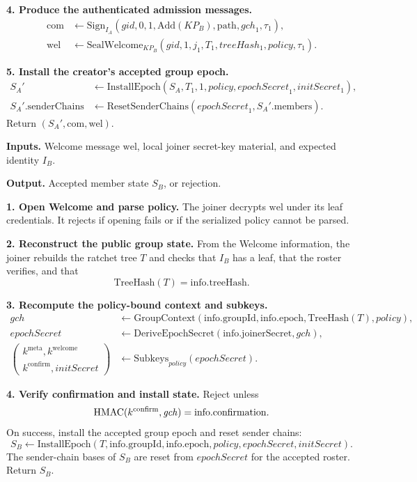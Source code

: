 \documentclass[preprint,12pt]{elsarticle}
\theoremstyle{definition}
\newcommand{\tech}[1]{\textnormal{#1}}
\renewcommand{\mathsf}[1]{\mathrm{#1}}
\newcommand{\HMAC}{\tech{HMAC}}
\newcommand{\gid}{\mathit{gid}}
\newcommand{\gch}{\mathit{gch}}
\newcommand{\initsec}{\mathit{initSecret}}
\newcommand{\epochsec}{\mathit{epochSecret}}
\newcommand{\policy}{\mathit{policy}}
\newcommand{\treehash}{\mathit{treeHash}}
\begin{document}
\begin{algorithm}[H]
\textbf{4. Produce the authenticated admission messages.}
\[
\begin{aligned}
\mathsf{com}&\gets
  \mathrm{Sign}_{I_A}(\gid,0,1,\mathsf{Add}(KP_B),\mathsf{path},\gch_1,\tau_1),\\
\mathsf{wel}&\gets
  \mathrm{SealWelcome}_{KP_B}
    (\gid,1,j_1,T_1,\treehash_1,\policy,\tau_1).
\end{aligned}
\]

\textbf{5. Install the creator's accepted group epoch.}
\[
\begin{aligned}
S_A'&\gets \mathrm{InstallEpoch}(S_A,T_1,1,\policy,\epochsec_1,\initsec_1),\\
S_A'.\mathrm{senderChains}&\gets
  \mathrm{ResetSenderChains}(\epochsec_1,S_A'.\mathrm{members}).
\end{aligned}
\]
Return $(S_A',\mathsf{com},\mathsf{wel})$.
\end{algorithm}
\endgroup

\begingroup
\LinesNotNumbered
\SetAlgoNoLine
\begin{algorithm}[H]
\caption{Process a Welcome as the joining member.}\label{alg:welcome}
\footnotesize
\textbf{Inputs.}
Welcome message $\mathsf{wel}$, local joiner secret-key material, and expected identity $I_B$.

\textbf{Output.}
Accepted member state $S_B$, or rejection.
\vspace{0.25\baselineskip}

\textbf{1. Open Welcome and parse policy.}
The joiner decrypts $\mathsf{wel}$ under its leaf credentials. It rejects if
opening fails or if the serialized policy cannot be parsed.

\textbf{2. Reconstruct the public group state.}
From the Welcome information, the joiner rebuilds the ratchet tree $T$ and
checks that $I_B$ has a leaf, that the roster verifies, and that
\[
  \mathsf{TreeHash}(T)=\mathsf{info.treeHash}.
\]

\textbf{3. Recompute the policy-bound context and subkeys.}
\[
\begin{aligned}
\gch&\gets \mathsf{GroupContext}(\mathsf{info.groupId},
  \mathsf{info.epoch},\mathsf{TreeHash}(T),\policy),\\
\epochsec&\gets
  \mathrm{DeriveEpochSecret}(\mathsf{info.joinerSecret},\gch),\\
\left(\begin{gathered}
  k^{\mathsf{meta}},k^{\mathsf{welcome}}\\
  k^{\mathsf{confirm}},\initsec
\end{gathered}\right)
  &\gets \mathrm{Subkeys}_{\policy}(\epochsec).
\end{aligned}
\]

\textbf{4. Verify confirmation and install state.}
Reject unless
\[
  \HMAC(k^{\mathsf{confirm}},\gch)=\mathsf{info.confirmation}.
\]
On success, install the accepted group epoch and reset sender chains:
\[
S_B\gets \mathrm{InstallEpoch}(T,\mathsf{info.groupId},
  \mathsf{info.epoch},\policy,\epochsec,\initsec).
\]
The sender-chain bases of $S_B$ are reset from $\epochsec$ for the accepted roster.
Return $S_B$.
\end{algorithm}
\endgroup
\FloatBarrier
\end{document}
